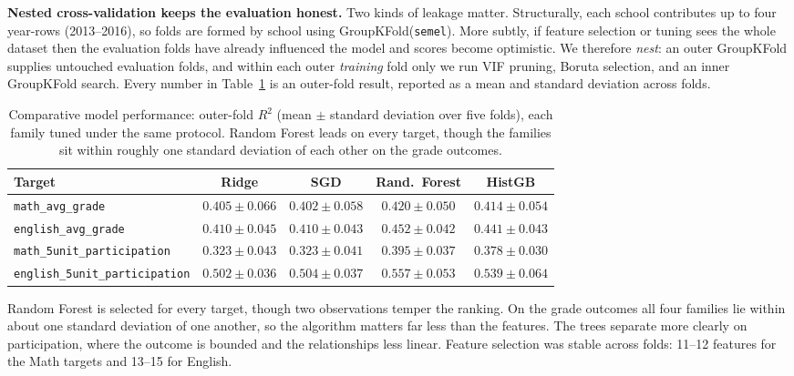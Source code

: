 \textbf{Nested cross-validation keeps the evaluation honest.} Two kinds of
leakage matter. Structurally, each school contributes up to four year-rows
(2013--2016), so folds are formed by school using GroupKFold(\texttt{semel}).
More subtly, if feature selection or tuning sees the whole dataset then the
evaluation folds have already influenced the model and scores become optimistic.
We therefore \emph{nest}: an outer GroupKFold supplies untouched evaluation
folds, and within each outer \emph{training} fold only we run VIF pruning, Boruta
selection, and an inner GroupKFold search. Every number in
Table~\ref{tab:leaderboard} is an outer-fold result, reported as a mean and
standard deviation across folds.

\begin{table}[H]
\centering
\footnotesize
\renewcommand{\arraystretch}{1.3}
\caption{Comparative model performance: outer-fold $R^2$ (mean $\pm$ standard
deviation over five folds), each family tuned under the same protocol. Random
Forest leads on every target, though the families sit within roughly one
standard deviation of each other on the grade outcomes.}
\label{tab:leaderboard}
\begin{tabular}{@{}>{\raggedright\arraybackslash}p{4.5cm}cccc@{}}
\toprule
\textbf{Target} & \textbf{Ridge} & \textbf{SGD} & \textbf{Rand.\ Forest} & \textbf{HistGB} \\
\midrule
\texttt{math\_avg\_grade}              & $0.405\!\pm\!0.066$ & $0.402\!\pm\!0.058$ & $\mathbf{0.420\!\pm\!0.050}$ & $0.414\!\pm\!0.054$ \\
\texttt{english\_avg\_grade}           & $0.410\!\pm\!0.045$ & $0.410\!\pm\!0.043$ & $\mathbf{0.452\!\pm\!0.042}$ & $0.441\!\pm\!0.043$ \\
\texttt{math\_5unit\_participation}    & $0.323\!\pm\!0.043$ & $0.323\!\pm\!0.041$ & $\mathbf{0.395\!\pm\!0.037}$ & $0.378\!\pm\!0.030$ \\
\texttt{english\_5unit\_participation} & $0.502\!\pm\!0.036$ & $0.504\!\pm\!0.037$ & $\mathbf{0.557\!\pm\!0.053}$ & $0.539\!\pm\!0.064$ \\
\bottomrule
\end{tabular}
\end{table}

Random Forest is selected for every target, though two observations temper the
ranking. On the grade outcomes all four families lie within about one standard
deviation of one another, so the algorithm matters far less than the features.
The trees separate more clearly on participation, where the outcome is bounded
and the relationships less linear. Feature selection was stable across folds:
11--12 features for the Math targets and 13--15 for English.

